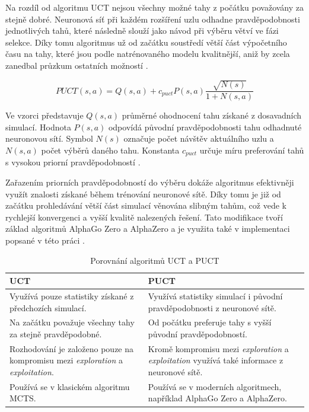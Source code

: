 Na rozdíl od algoritmu UCT nejsou všechny možné tahy z počátku považovány za stejně dobré. Neuronová síť při každém rozšíření 
uzlu odhadne pravděpodobnosti jednotlivých tahů, které následně slouží jako návod při výběru větví ve fázi selekce. Díky 
tomu algoritmus už od začátku soustředí větší část výpočetního času na tahy, které jsou podle natrénovaného modelu kvalitnější, 
aniž by zcela zanedbal průzkum ostatních možností \cite{silver2017alphazero}.

\[
PUCT(s,a)=
Q(s,a)
+
c_{puct}
P(s,a)
\frac{\sqrt{N(s)}}{1+N(s,a)}
\]

Ve vzorci představuje $Q(s,a)$ průměrné ohodnocení tahu získané z dosavadních simulací. Hodnota $P(s,a)$ odpovídá původní 
pravděpodobnosti tahu odhadnuté neuronovou sítí. Symbol $N(s)$ označuje počet návštěv aktuálního uzlu a $N(s,a)$ počet výběrů 
daného tahu. Konstanta $c_{puct}$ určuje míru preferování tahů s vysokou priorní pravděpodobností \cite{silver2017alphazero}.

Zařazením priorních pravděpodobností do výběru dokáže algoritmus efektivněji využít znalosti získané během 
trénování neuronové sítě. Díky tomu je již od začátku prohledávání větší část simulací věnována slibným tahům, což vede 
k rychlejší konvergenci a vyšší kvalitě nalezených řešení. Tato modifikace tvoří základ algoritmů AlphaGo Zero a 
AlphaZero a je využita také v implementaci popsané v této práci \cite{silver2017alphazero}.

\begin{table}[H]
\centering
\caption{Porovnání algoritmů UCT a PUCT}
\label{tab:uct_vs_puct}
\begin{tabular}{p{6cm}p{6cm}}
\toprule
\textbf{UCT} & \textbf{PUCT} \\
\midrule

Využívá pouze statistiky získané z předchozích simulací. &
Využívá statistiky simulací i původní pravděpodobnosti z neuronové sítě. \\
\midrule

Na začátku považuje všechny tahy za stejně pravděpodobné. &
Od počátku preferuje tahy s vyšší původní pravděpodobností. \\
\midrule

Rozhodování je založeno pouze na kompromisu mezi \emph{exploration} a \emph{exploitation}. &
Kromě kompromisu mezi \emph{exploration} a \emph{exploitation} využívá také informace z neuronové sítě. \\
\midrule

Používá se v klasickém algoritmu MCTS. &
Používá se v moderních algoritmech, například AlphaGo Zero a AlphaZero. \\

\bottomrule
\end{tabular}
\end{table}

